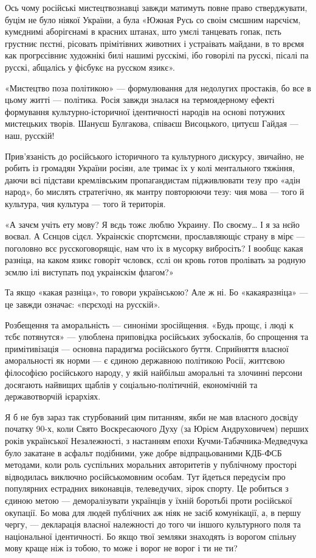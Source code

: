 Ось чому російські мистецтвознавці завжди матимуть повне право стверджувати,
буцім не було ніякої України, а була «Южная Русь со своім смєшним нарєчієм,
кумєднимі аборігєнамі в красних штанах, што умєлі танцевать гопак, пєть
грустниє пєстні, рісовать прімітівних животних і устраівать майдани, в то врємя
как прогрєсівниє художнікі билі нашимі русскімі, ібо говорілі па русскі, пісалі
па русскі, абщалісь у фісбукє на русском язикє».

«Мистецтво поза політикою» — формулювання для недолугих простаків, бо все в
цьому житті — політика. Росія завжди зналася на термоядерному ефекті формування
культурно-історичної ідентичності народів на основі потужних мистецьких творів.
Шануєш Булгакова, співаєш Висоцького, цитуєш Гайдая — наш, русскій! 

Прив’язаність до російського історичного та культурного дискурсу, звичайно, не
робить із громадян України росіян, але тримає їх у колі ментального тяжіння,
даючи всі підстави кремлівським пропагандистам підживлювати тезу про «адін
народ», бо мислять стратегічно, як мантру повторюючи тезу: чия мова — того й
культура, чия культура — того й територія.

«А зачєм учіть ету мову? Я вєдь тожє люблю Украину. По своєму… І я за нєйо
воєвал. А Сєнцов сідєл. Украінскіє спортсмєни, прославляющіє страну в мірє —
поголовно всє русскоговорящіє, нам что іх в мусорку вибросіть? І вообщє какая
разніца, на каком язикє говоріт чєловєк, єслі он кровь готов пролівать за
родную зємлю ілі виступать под украінскім флагом?»

Та якщо «какая разніца», то говори українською? Але ж ні. Бо «какаяразніца» —
це завжди означає: «пєрєході на русскій».

Розбещення та аморальність — синоніми зросійщення. «Будь прощє, і люді к тєбє
потянутся» — улюблена приповідка російських зубоскалів, бо спрощення та
примітивізація — основна парадигма російського буття. Сприйняття власної
аморальності як норми — є єдиною державною політикою Росії, життєвою філософією
російського народу, у якій найбільш аморальні та злочинні персони досягають
найвищих щаблів у соціально-політичній, економічній та державотворчій
ієрархіях.

Я б не був зараз так стурбований цим питанням, якби не мав власного досвіду
початку 90-х, коли Свято Воскресаючого Духу (за Юрієм Андруховичем) перших
років української Незалежності, з настанням епохи Кучми-Табачника-Медведчука
було закатане в асфальт подібними, уже добре відпрацьованими КДБ-ФСБ методами,
коли роль суспільних моральних авторитетів у публічному просторі відводилась
виключно російськомовним особам. Тут йдеться передусім про популярних естрадних
виконавців, телеведучих, зірок спорту. Це робиться з єдиною метою —
деморалізувати українців у їхній боротьбі проти російської окупації. Бо мова
для людей публічних аж ніяк не засіб комунікації, а, в першу чергу, —
декларація власної належності до того чи іншого культурного поля та
національної ідентичності. Бо якщо твої земляки знаходять із ворогом спільну
мову краще ніж із тобою, то може і ворог не ворог і ти не ти?

